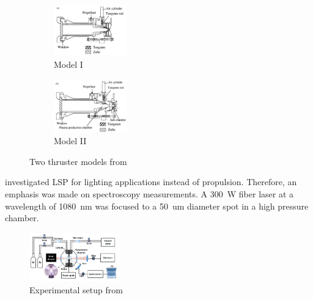         \begin{figure}[h]
            \centering
            \begin{subfigure}[t]{0.45\textwidth}
                \centering
                \includegraphics[width=0.35\textwidth]{assets/2 background/Toyoda apparatus model 1.jpg}
                \caption{Model I}
                \label{fig:Toyoda apparatus 1}
            \end{subfigure}
            \hfill
            \begin{subfigure}[t]{0.45\textwidth}
                \centering
                \includegraphics[width=0.35\textwidth]{assets/2 background/Toyoda Apparatus model 2.png}
                \caption{Model II}
                \label{fig:Toyoda apparatus 2}
            \end{subfigure}
            \caption{Two thruster models from \textcite{toyodaThrustPerformanceCW2002}}
        \end{figure}



        \textcite{luCharacteristicDiagnosticsLaserStabilized2022a} investigated LSP for lighting applications instead of propulsion. Therefore, an emphasis was made on spectroscopy measurements. A \qty{300}{W} fiber laser at a wavelength of \qty{1080}{nm} was focused to a \qty{50}{um} diameter spot in a high pressure chamber.
        
        \begin{figure}[h]
            \centering
            \includegraphics[width=0.35\textwidth]{assets/2 background/Lu apparatus.png}
            \caption{Experimental setup from \textcite{luCharacteristicDiagnosticsLaserStabilized2022a}}
            \label{fig:Lu apparatus}
        \end{figure}

